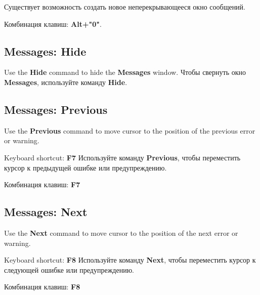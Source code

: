 Существует возможность создать новое неперекрывающееся окно сообщений.

Комбинация клавиш: {\bf Alt+"0"}.
\fi
\subsection{Messages: Hide}

\ifenglish
Use the {\bf Hide} command to hide the {\bf Messages}
window.
\else
Чтобы свернуть окно {\bf Messages}, используйте команду {\bf Hide}.
\fi
\subsection{Messages: Previous}

\ifenglish
Use the {\bf Previous} command to move cursor to the position
of the previous error or warning.

Keyboard shortcut: {\bf F7}
\else
Используйте команду {\bf Previous}, чтобы переместить курсор к предыдущей
ошибке или предупреждению.

Комбинация клавиш: {\bf F7}
\fi
\subsection{Messages: Next}

\ifenglish
Use the {\bf Next} command to move cursor to the position
of the next error or warning.

Keyboard shortcut: {\bf F8}
\else
Используйте команду {\bf Next}, чтобы переместить курсор к следующей ошибке
или предупреждению.

Комбинация клавиш: {\bf F8}
\fi